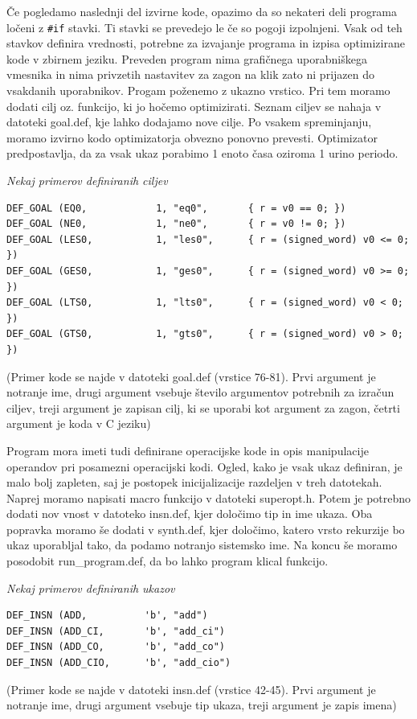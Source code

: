 \documentclass[a4paper, 12pt]{book}
\begin{document}
	Če pogledamo naslednji del izvirne kode, opazimo da so nekateri deli programa ločeni z \texttt{\#if} stavki. Ti stavki se prevedejo le če so pogoji izpolnjeni. Vsak od teh stavkov definira vrednosti, potrebne za izvajanje programa in izpisa optimizirane kode v zbirnem jeziku. Preveden program nima grafičnega uporabniškega vmesnika in nima privzetih nastavitev za zagon na klik zato ni prijazen do vsakdanih uporabnikov. Progam poženemo z ukazno vrstico. Pri tem moramo dodati cilj oz. funkcijo, ki jo hočemo optimizirati. Seznam ciljev se nahaja v datoteki goal.def, kje lahko dodajamo nove cilje. Po vsakem spreminjanju, moramo izvirno kodo optimizatorja obvezno ponovno prevesti. Optimizator predpostavlja, da za vsak ukaz porabimo 1 enoto časa oziroma 1 urino periodo.
	
		
		\medskip
		
		\noindent
		{\it Nekaj primerov definiranih ciljev}
\begin{Verbatim}[baselinestretch=1]
DEF_GOAL (EQ0,            1, "eq0",       { r = v0 == 0; })
DEF_GOAL (NE0,            1, "ne0",       { r = v0 != 0; })
DEF_GOAL (LES0,           1, "les0",      { r = (signed_word) v0 <= 0; })
DEF_GOAL (GES0,           1, "ges0",      { r = (signed_word) v0 >= 0; })
DEF_GOAL (LTS0,           1, "lts0",      { r = (signed_word) v0 < 0; })
DEF_GOAL (GTS0,           1, "gts0",      { r = (signed_word) v0 > 0; })
\end{Verbatim}
		\noindent
		{\small (Primer kode se najde v datoteki goal.def (vrstice 76-81). Prvi argument je notranje ime, drugi argument vsebuje število argumentov potrebnih za izračun ciljev, treji argument je zapisan cilj, ki se uporabi kot argument za zagon, četrti argument je koda v C jeziku)}
	
	Program mora imeti tudi definirane operacijske kode in opis manipulacije operandov pri posamezni operacijski kodi. Ogled, kako je vsak ukaz definiran, je malo bolj zapleten, saj je postopek inicijalizacije razdeljen v treh datotekah. Naprej moramo napisati macro funkcijo v datoteki superopt.h. Potem je potrebno dodati nov vnost v datoteko insn.def, kjer določimo tip in ime ukaza. Oba popravka moramo še dodati v synth.def, kjer določimo, katero vrsto rekurzije bo ukaz uporabljal tako, da podamo notranjo sistemsko ime. Na koncu še moramo posodobit run\_program.def, da bo lahko program klical funkcijo.
		
			\medskip
			
			\noindent
			{\it Nekaj primerov definiranih ukazov}
			\begin{Verbatim}[baselinestretch=1]
DEF_INSN (ADD,          'b', "add")
DEF_INSN (ADD_CI,       'b', "add_ci")
DEF_INSN (ADD_CO,       'b', "add_co")
DEF_INSN (ADD_CIO,      'b', "add_cio")
			\end{Verbatim}
				\noindent
				{\small (Primer kode se najde v datoteki insn.def (vrstice 42-45). Prvi argument je notranje ime, drugi argument vsebuje tip ukaza, treji argument je zapis imena)}
				
\end{document}
